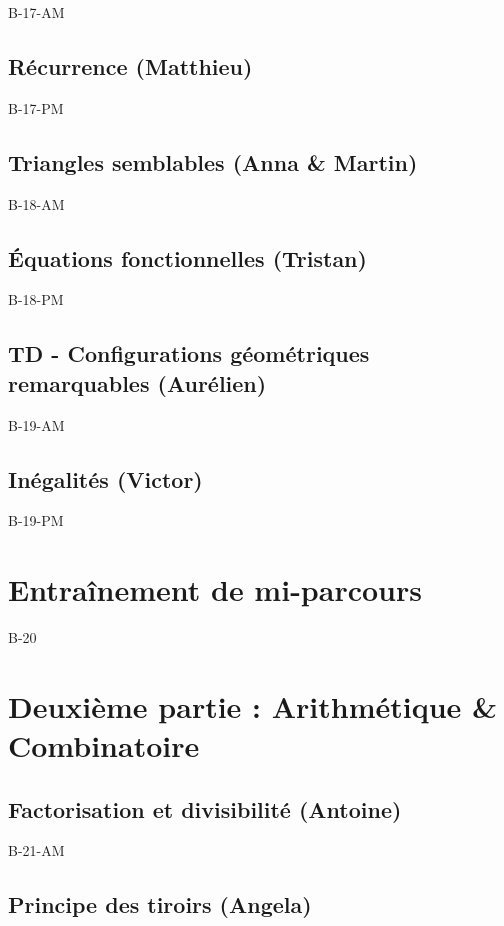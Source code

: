 \documentclass[poly,trombi]{valbonne}
\begin{document}
{B-17-AM}

\subsection{Récurrence (Matthieu)}

{B-17-PM}

\subsection{Triangles semblables (Anna \& Martin)}

{B-18-AM}

\subsection{Équations fonctionnelles (Tristan)}

{B-18-PM}

\subsection{TD - Configurations géométriques remarquables (Aurélien)}

{B-19-AM}

\subsection{Inégalités (Victor)}

{B-19-PM}


\section{Entraînement de mi-parcours}

{B-20}


\section{Deuxième partie : Arithmétique \& Combinatoire}

\subsection{Factorisation et divisibilité (Antoine)}

{B-21-AM}

\subsection{Principe des tiroirs (Angela)}
\end{document}
